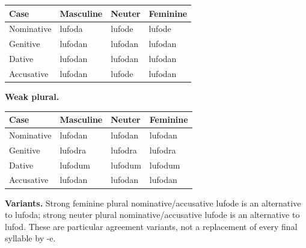 \par\begingroup
\fontsize{10.5}{13.2}\selectfont
\setlength{\LTleft}{0pt}\setlength{\LTright}{\fill}
\noindent
\begin{tabular}{@{}>{\raggedright\arraybackslash}p{22.0mm}>{\raggedright\arraybackslash}p{31.188mm}>{\raggedright\arraybackslash}p{31.188mm}>{\raggedright\arraybackslash}p{31.188mm}@{}}
\toprule
\textbf{Case} & \textbf{Masculine} & \textbf{Neuter} & \textbf{Feminine} \\
\midrule
Nominative & lufoda & lufode & lufode \\
Genitive & lufodan & lufodan & lufodan \\
Dative & lufodan & lufodan & lufodan \\
Accusative & lufodan & lufode & lufodan \\
\bottomrule
\end{tabular}
\par\endgroup
\textbf{Weak plural.}

\par\begingroup
\fontsize{10.5}{13.2}\selectfont
\setlength{\LTleft}{0pt}\setlength{\LTright}{\fill}
\noindent
\begin{tabular}{@{}>{\raggedright\arraybackslash}p{22.0mm}>{\raggedright\arraybackslash}p{31.188mm}>{\raggedright\arraybackslash}p{31.188mm}>{\raggedright\arraybackslash}p{31.188mm}@{}}
\toprule
\textbf{Case} & \textbf{Masculine} & \textbf{Neuter} & \textbf{Feminine} \\
\midrule
Nominative & lufodan & lufodan & lufodan \\
Genitive & lufodra & lufodra & lufodra \\
Dative & lufodum & lufodum & lufodum \\
Accusative & lufodan & lufodan & lufodan \\
\bottomrule
\end{tabular}
\par\endgroup
\textbf{Variants.} Strong feminine plural nominative/\allowbreak{}accusative lufode is an alternative to lufoda; strong neuter plural nominative/\allowbreak{}accusative lufode is an alternative to lufod. These are particular agreement variants, not a replacement of every final syllable by -e.

